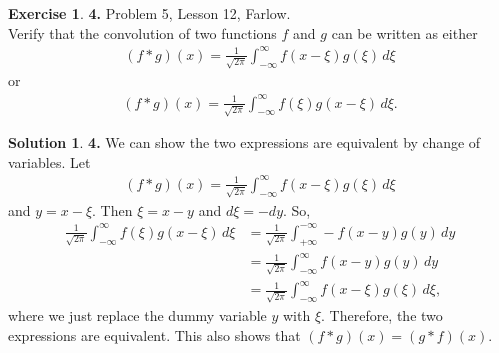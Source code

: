\documentclass{book}
\theoremstyle{definition}
\newtheorem*{exer*}{Exercise}
\newtheorem*{sln*}{Solution}
\newcommand{\f}[2]{\frac{#1}{#2}}
\begin{document}
\newpage

\begin{exer*}\textbf{4. }Problem 5, Lesson 12, Farlow.\\
	
	Verify that the convolution of two functions $f$ and $g$ can be written as either 
	\begin{align*}
	(f\ast g)(x) = \f{1}{\sqrt{2\pi}} \int^\infty_{-\infty} f(x-\xi)g(\xi)\, d\xi
	\end{align*}
	or
	\begin{align*}
	(f\ast g)(x) = \f{1}{\sqrt{2\pi}}\int^\infty_{-\infty} f(\xi)g(x - \xi)\, d\xi.
	\end{align*}
	
	
	\begin{sln*}\textbf{4.}
	We can show the two expressions are equivalent by change of variables. Let 
	\begin{align*}
	(f\ast g)(x) = \f{1}{\sqrt{2\pi}} \int^\infty_{-\infty} f(x-\xi)g(\xi)\, d\xi
	\end{align*}
	and $y = x - \xi$. Then $\xi = x-y$ and $d\xi = -dy$. So,
	\begin{align*}
	\f{1}{\sqrt{2\pi}}\int^\infty_{-\infty} f(\xi)g(x - \xi)\, d\xi
	&= \f{1}{\sqrt{2\pi}} \int^{-\infty}_{+\infty} -f(x-y)g(y)\,dy\\
	&= \f{1}{\sqrt{2\pi}} \int^{\infty}_{-\infty} f(x-y)g(y)\,dy\\
	&= \f{1}{\sqrt{2\pi}} \int^\infty_{-\infty} f(x-\xi)g(\xi)\, d\xi,
	\end{align*}
	where we just replace the dummy variable $y$ with $\xi$. Therefore, the two expressions are equivalent. This also shows that $(f\ast g)(x) = (g\ast f)(x)$. 
	\end{sln*}
\end{exer*}

\newpage
\end{document}

